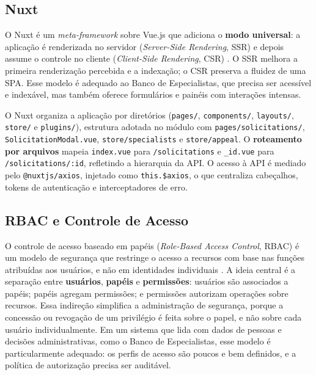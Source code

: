 \subsection{Nuxt}
\label{subsec:nuxt}

O Nuxt é um \textit{meta-framework} sobre Vue.js que adiciona o \textbf{modo universal}:
a aplicação é renderizada no servidor (\textit{Server-Side Rendering}, SSR) e depois
assume o controle no cliente (\textit{Client-Side Rendering}, CSR) \cite{nuxt2024}. O
SSR melhora a primeira renderização percebida e a indexação; o CSR preserva a fluidez de
uma SPA. Esse modelo é adequado ao Banco de Especialistas, que precisa ser acessível e
indexável, mas também oferece formulários e painéis com interações intensas.

O Nuxt organiza a aplicação por diretórios (\texttt{pages/}, \texttt{components/},
\texttt{layouts/}, \texttt{store/} e \texttt{plugins/}), estrutura adotada no módulo com
\texttt{pages/solicitations/}, \texttt{SolicitationModal.vue},
\texttt{store/specialists} e \texttt{store/appeal}. O \textbf{roteamento por arquivos}
mapeia \texttt{index.vue} para \texttt{/solicitations} e \texttt{\_id.vue} para
\texttt{/solicitations/:id}, refletindo a hierarquia da API. O acesso à API é mediado
pelo \texttt{@nuxtjs/axios}, injetado como \texttt{this.\$axios}, o que centraliza
cabeçalhos, tokens de autenticação e interceptadores de erro.

\subsection{RBAC e Controle de Acesso}
\label{subsec:rbac-controle-acesso}

O controle de acesso baseado em papéis (\textit{Role-Based Access Control}, RBAC) é um
modelo de segurança que restringe o acesso a recursos com base nas funções atribuídas
aos usuários, e não em identidades individuais \cite{sandhu1996}. A ideia central é a
separação entre \textbf{usuários}, \textbf{papéis} e \textbf{permissões}: usuários são
associados a papéis; papéis agregam permissões; e permissões autorizam operações sobre
recursos. Essa indireção simplifica a administração de segurança, porque a concessão ou
revogação de um privilégio é feita sobre o papel, e não sobre cada usuário
individualmente. Em um sistema que lida com dados de pessoas e decisões administrativas,
como o Banco de Especialistas, esse modelo é particularmente adequado: os perfis de
acesso são poucos e bem definidos, e a política de autorização precisa ser auditável.


